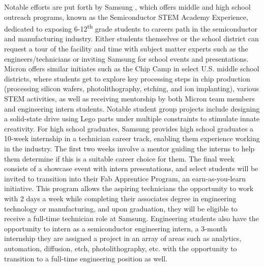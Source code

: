 Notable efforts are put forth by Samsung \cite{samsung}, which offers middle and high school outreach programs, known as the Semiconductor STEM Academy Experience, dedicated to exposing 6-12\textsuperscript{th} grade students to careers path in the semiconductor and manufacturing industry. Either students themselves or the school district can request a tour of the facility and time with subject matter experts such as the engineers/technicians or inviting Samsung for school events and presentations. Micron offers similar initiates such as the Chip Camp in select U.S. middle school districts, where students get to explore key processing steps in chip production (processing silicon wafers, photolithography, etching, and ion implanting), various STEM activities, as well as receiving mentorship by both Micron team members and engineering intern students. Notable student group projects include designing a solid-state drive using Lego parts under multiple constraints to stimulate innate creativity. For high school graduates, Samsung provides high school graduates a 10-week internship in a technician career track, enabling them experience working in the industry. The first two weeks involve a mentor guiding the interns to help them determine if this is a suitable career choice for them. The final week consists of a showcase event with intern presentations, and select students will be invited to transition into their Fab Apprentice Program, an earn-as-you-learn initiative. This program allows the aspiring technicians the opportunity to work with 2 days a week while completing their associates degree in engineering technology or manufacturing, and upon graduation, they will be eligible to receive a full-time technician role at Samsung. Engineering students also have the opportunity to intern as a semiconductor engineering intern, a 3-month internship they are assigned a project in an array of areas such as analytics, automation, diffusion, etch, photolithography, etc. with the opportunity to transition to a full-time engineering position as well.

